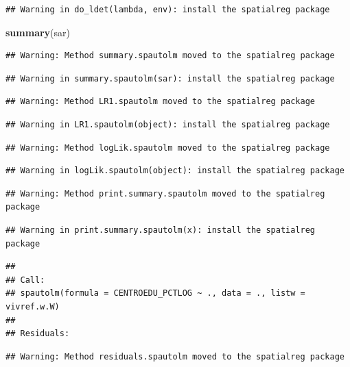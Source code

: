 \documentclass[11pt,]{article}
\newenvironment{Shaded}{\begin{snugshade}}{\end{snugshade}}
\newcommand{\KeywordTok}[1]{\textcolor[rgb]{0.13,0.29,0.53}{\textbf{#1}}}
\newcommand{\NormalTok}[1]{#1}
\begin{document}
\begin{verbatim}
## Warning in do_ldet(lambda, env): install the spatialreg package
\end{verbatim}

\begin{Shaded}
\begin{Highlighting}[]
\KeywordTok{summary}\NormalTok{(sar)}
\end{Highlighting}
\end{Shaded}

\begin{verbatim}
## Warning: Method summary.spautolm moved to the spatialreg package
\end{verbatim}

\begin{verbatim}
## Warning in summary.spautolm(sar): install the spatialreg package
\end{verbatim}

\begin{verbatim}
## Warning: Method LR1.spautolm moved to the spatialreg package
\end{verbatim}

\begin{verbatim}
## Warning in LR1.spautolm(object): install the spatialreg package
\end{verbatim}

\begin{verbatim}
## Warning: Method logLik.spautolm moved to the spatialreg package
\end{verbatim}

\begin{verbatim}
## Warning in logLik.spautolm(object): install the spatialreg package
\end{verbatim}

\begin{verbatim}
## Warning: Method print.summary.spautolm moved to the spatialreg package
\end{verbatim}

\begin{verbatim}
## Warning in print.summary.spautolm(x): install the spatialreg package
\end{verbatim}

\begin{verbatim}
## 
## Call: 
## spautolm(formula = CENTROEDU_PCTLOG ~ ., data = ., listw = vivref.w.W)
## 
## Residuals:
\end{verbatim}

\begin{verbatim}
## Warning: Method residuals.spautolm moved to the spatialreg package
\end{verbatim}
\end{document}
